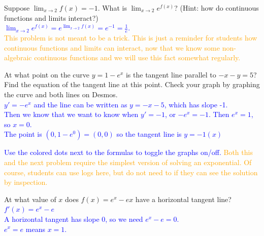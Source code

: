 \documentclass{ximera}
\begin{document}
\begin{exercise}
    Suppose $\displaystyle \lim_{x\rightarrow 2} f(x)=-1$. 
    What is $\displaystyle \lim_{x\rightarrow 2}e^{f(x)}$? (Hint: how do continuous functions and limits interact?)\\
    \textcolor{blue}{ $\lim_{x\rightarrow 2} e^{f(x)}=e^{\lim_{x\rightarrow 2} f(x)}=e^{-1}=\frac1e$.}\\
    \textcolor{orange}{This problem is not meant to be a trick.  This is just a reminder for students how continuous functions and limits can interact, now that we know some non-algebraic continuous functions and we will use this fact somewhat regularly.}
\end{exercise}


\begin{exercise}
    At what point on the curve $y=1-e^x$ is the tangent line parallel to $-x-y=5$?   Find the equation of the tangent line at this point.  Check your graph by graphing the curve and both lines on Desmos.\\
     \textcolor{blue}{$y'=-e^x$ and the line can be written as $y=-x-5$, which has slope -1.  \\
    Then we know that we want to know when $y'=-1$, or $-e^x=-1$.  Then $e^x=1$, so $x=0$.  \\
    The point is $(0, 1-e^0)=(0,0)$ so the tangent line is $y=-1(x)$}
    \begin{center}
    \end{center}
    \textcolor{blue}{Use the colored dots next to the formulas to toggle the graphs on/off.}
    \textcolor{orange}{Both this and the next problem require the simplest version of solving an exponential.  Of course, students can use logs here, but do not need to if they can see the solution by inspection.}
\end{exercise} 

\begin{exercise}
    At what value of $x$ does $f(x)=e^x-ex$ have a horizontal tangent line? \\
    \textcolor{blue}{ $f'(x)=e^x-e$\\
    A horizontal tangent has slope 0, so we need $e^x-e=0$.\\
    $e^x=e$ means $x=1$.}
\end{exercise}
\end{document}
